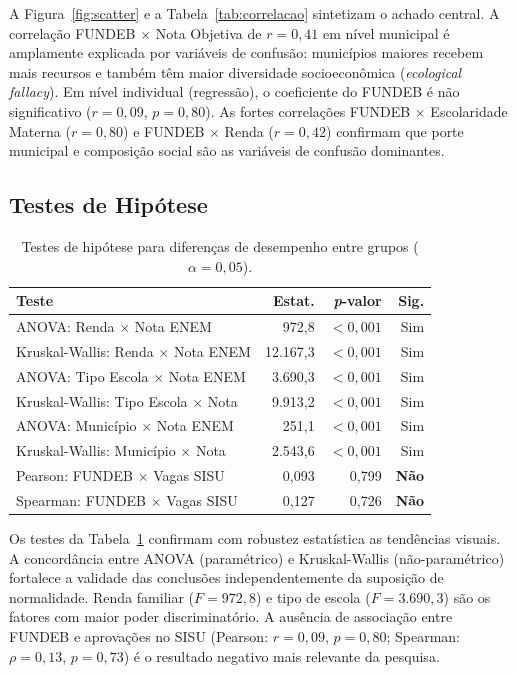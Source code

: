 \documentclass[12pt]{article}
\begin{document}
A Figura~\ref{fig:scatter} e a Tabela~\ref{tab:correlacao} sintetizam o achado central.
A correlação FUNDEB $\times$ Nota Objetiva de $r = 0{,}41$ em nível municipal é
amplamente explicada por variáveis de confusão: municípios maiores recebem mais recursos
e também têm maior diversidade socioeconômica (\textit{ecological fallacy}). Em nível
individual (regressão), o coeficiente do FUNDEB é não significativo ($r = 0{,}09$,
$p = 0{,}80$). As fortes correlações FUNDEB $\times$ Escolaridade Materna
($r = 0{,}80$) e FUNDEB $\times$ Renda ($r = 0{,}42$) confirmam que porte municipal
e composição social são as variáveis de confusão dominantes.

\subsection{Testes de Hipótese}

\begin{table}[ht]
\centering
\caption{Testes de hipótese para diferenças de desempenho entre grupos ($\alpha = 0{,}05$).}
\label{tab:testes}
\small
\begin{tabular}{lrrr}
\toprule
\textbf{Teste} & \textbf{Estat.} & \textbf{\textit{p}-valor} & \textbf{Sig.} \\
\midrule
ANOVA: Renda $\times$ Nota ENEM             &   972,8 & $<0{,}001$ & Sim \\
Kruskal-Wallis: Renda $\times$ Nota ENEM    & 12.167,3 & $<0{,}001$ & Sim \\
ANOVA: Tipo Escola $\times$ Nota ENEM       & 3.690,3 & $<0{,}001$ & Sim \\
Kruskal-Wallis: Tipo Escola $\times$ Nota   & 9.913,2 & $<0{,}001$ & Sim \\
ANOVA: Município $\times$ Nota ENEM         &   251,1 & $<0{,}001$ & Sim \\
Kruskal-Wallis: Município $\times$ Nota     & 2.543,6 & $<0{,}001$ & Sim \\
Pearson: FUNDEB $\times$ Vagas SISU         & 0,093 & 0,799      & \textbf{Não} \\
Spearman: FUNDEB $\times$ Vagas SISU        & 0,127 & 0,726      & \textbf{Não} \\
\bottomrule
\end{tabular}
\end{table}

Os testes da Tabela~\ref{tab:testes} confirmam com robustez estatística as tendências
visuais. A concordância entre ANOVA (paramétrico) e Kruskal-Wallis (não-paramétrico)
fortalece a validade das conclusões independentemente da suposição de normalidade.
Renda familiar ($F = 972{,}8$) e tipo de escola ($F = 3.690{,}3$) são os fatores com
maior poder discriminatório. A ausência de associação entre FUNDEB e aprovações no SISU
(Pearson: $r = 0{,}09$, $p = 0{,}80$; Spearman: $\rho = 0{,}13$, $p = 0{,}73$) é
o resultado negativo mais relevante da pesquisa.
\end{document}
